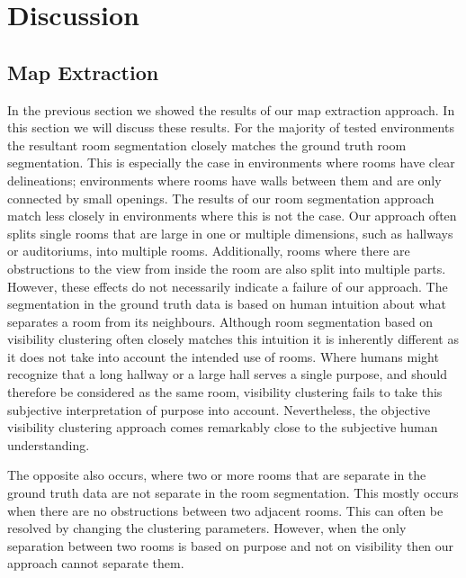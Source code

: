 \section{Discussion}

\subsection{Map Extraction}
\label{section:map_extraction}
In the previous section we showed the results of our map extraction approach. In this section we will discuss these results. For the majority of tested environments the resultant room segmentation closely matches the ground truth room segmentation. This is especially the case in environments where rooms have clear delineations; environments where rooms have walls between them and are only connected by small openings. The results of our room segmentation approach match less closely in environments where this is not the case. Our approach often splits single rooms that are large in one or multiple dimensions, such as hallways or auditoriums, into multiple rooms. Additionally, rooms where there are obstructions to the view from inside the room are also split into multiple parts. However, these effects do not necessarily indicate a failure of our approach. The segmentation in the ground truth data is based on human intuition about what separates a room from its neighbours. Although room segmentation based on visibility clustering often closely matches this intuition it is inherently different as it does not take into account the intended use of rooms. Where humans might recognize that a long hallway or a large hall serves a single purpose, and should therefore be considered as the same room, visibility clustering fails to take this subjective interpretation of purpose into account. Nevertheless, the objective visibility clustering approach comes remarkably close to the subjective human understanding. 

The opposite also occurs, where two or more rooms that are separate in the ground truth data are not separate in the room segmentation. This mostly occurs when there are no obstructions between two adjacent rooms. This can often be resolved by changing the clustering parameters. However, when the only separation between two rooms is based on purpose and not on visibility then our approach cannot separate them.

